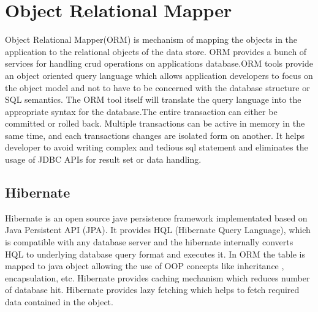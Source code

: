 \section{Object Relational Mapper}
					Object Relational Mapper(ORM) is mechanism of mapping the objects in the application to the relational objects of the data store. ORM provides a bunch of services for handling crud operations on applications database.ORM tools provide an object oriented query language which allows application developers to focus on the object model and not to have to be concerned with the database structure or SQL semantics. The ORM tool itself will translate the query language into the appropriate syntax for the database.The entire transaction can either be committed or rolled back. Multiple transactions can be active in memory in the same time, and each transactions changes are isolated form on another. It helps developer to avoid writing complex and tedious sql statement and eliminates the usage of JDBC APIs for result set or data handling.

\subsection{Hibernate}

				Hibernate is an open source jave persistence framework  implementated based on Java Persistent API (JPA). It provides HQL (Hibernate Query Language), which is compatible with any database server and the hibernate internally converts HQL to underlying database query format and executes it. In ORM the table is mapped to java object allowing the use of OOP concepts like inheritance , encapsulation, etc. Hibernate provides caching mechanism which reduces number of database hit. Hibernate provides lazy fetching which helps to fetch required data contained in the object.






